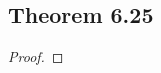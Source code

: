 \documentclass[../../main.tex]{subfiles}
\begin{document}
\subsection{Theorem 6.25}
\begin{wts}

\end{wts}
\begin{proof}

\end{proof}
\end{document}
